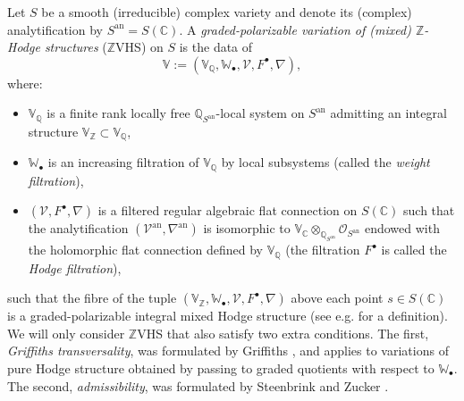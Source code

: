 \documentclass[10pt]{article}
\numberwithin{equation}{section}
\theoremstyle{plain}
\theoremstyle{definition}
\theoremstyle{remark}
\newcommand{\an}{\operatorname{an}}
\newcommand{\C}{\mathbb{C}}
\newcommand{\Q}{\mathbb{Q}}
\newcommand{\Z}{\mathbb{Z}}
\newcommand{\V}{\mathbb{V}}
\begin{document}
Let $S$ be a smooth (irreducible) complex variety and denote its (complex) analytification by $S^{\an}=S(\C)$. A \emph{graded-polarizable variation of (mixed) $\Z$-Hodge structures} ($\Z$VHS) on $S$ is the data of $$\V:=(\V_\Q, \mathbb{W}_{\bullet}, \mathcal{V}, F^\bullet, \nabla),$$ where:
\begin{itemize}
    \item $\V_\Q$ is a finite rank locally free $\Q_{S^{\an}}$-local system on $S^{\an}$ admitting an integral structure $\V_{\Z} \subset \V_{\Q}$,
    \item $\mathbb{W}_{\bullet}$ is an increasing filtration of $\V_{\mathbb{Q}}$ by local subsystems (called the \emph{weight filtration}),
    \item $(\mathcal{V}, F^\bullet, \nabla)$ is a filtered regular algebraic flat connection on $S(\C)$ such that the analytification $(\mathcal{V}^{\an}, \nabla^{\an})$ is isomorphic to $\V_\mathbb{C} \otimes_{\Q_{S^{\an}}} \mathcal{O}_{S^{{\an}}}$ endowed
with the holomorphic flat connection defined by $\V_\Q$ (the
filtration $F^\bullet$ is called the \emph{Hodge filtration}),
\end{itemize}
such that the fibre of the tuple $(\V_\Z, \mathbb{W}_{\bullet}, \mathcal{V}, F^\bullet, \nabla)$ above each point $s \in S(\mathbb{C})$ is a graded-polarizable integral mixed Hodge structure (see e.g. \cite[\S 2]{MR1154159} for a definition). We will only consider $\Z$VHS that also satisfy two extra conditions. The first, \emph{Griffiths transversality}, was formulated by Griffiths \cite{Griffiths}, and applies to variations of pure Hodge structure obtained by passing to graded quotients with respect to $\mathbb{W}_{\bullet}$. The second, \emph{admissibility}, was formulated by Steenbrink and Zucker \cite{zbMATH04017061}. 
\end{document}
